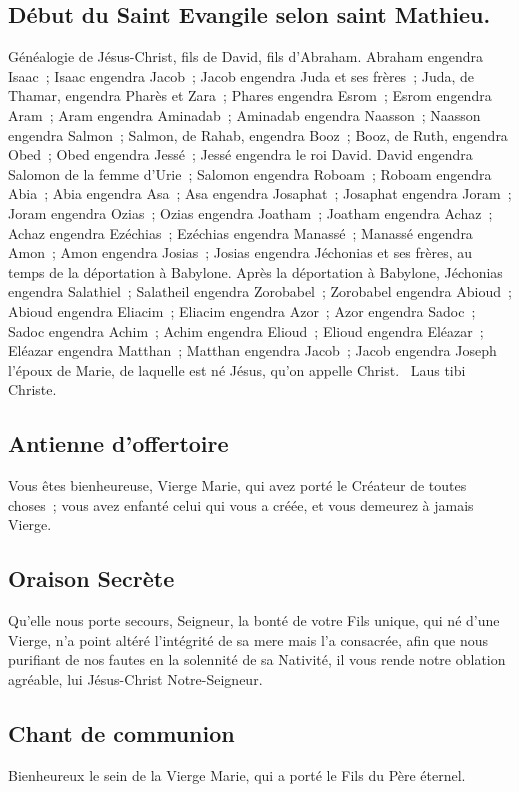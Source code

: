 \begin{multicols}{2}
{\subsection*{Début du Saint Evangile selon saint Mathieu.}
Généalogie de Jésus-Christ, fils de David, fils d’Abraham. Abraham engendra Isaac ; Isaac engendra Jacob ; Jacob engendra Juda et ses frères ; Juda, de Thamar, engendra Pharès et Zara ; Phares engendra Esrom ; Esrom engendra Aram ; Aram engendra Aminadab ; Aminadab engendra Naasson ; Naasson engendra Salmon ; Salmon, de Rahab, engendra Booz ; Booz, de Ruth, engendra Obed ; Obed engendra Jessé ; Jessé engendra le roi David. David engendra Salomon de la femme d’Urie ; Salomon engendra Roboam ; Roboam engendra Abia ; Abia engendra Asa ; Asa engendra Josaphat ; Josaphat engendra Joram ; Joram engendra Ozias ; Ozias engendra Joatham ; Joatham engendra Achaz ; Achaz engendra Ezéchias ; Ezéchias engendra Manassé ; Manassé engendra Amon ; Amon engendra Josias ; Josias engendra Jéchonias et ses frères, au temps de la déportation à Babylone. Après la déportation à Babylone, Jéchonias engendra Salathiel ; Salatheil engendra Zorobabel ; Zorobabel engendra Abioud ; Abioud engendra Eliacim ; Eliacim engendra Azor ; Azor engendra Sadoc ; Sadoc engendra Achim ; Achim engendra Elioud ; Elioud engendra Eléazar ; Eléazar engendra Matthan ; Matthan engendra Jacob ; Jacob engendra Joseph l’époux de Marie, de laquelle est né Jésus, qu’on appelle Christ.
{\textbf \rb\ Laus tibi Christe.}


\subsection*{Antienne d'offertoire}
Vous êtes bienheureuse, Vierge Marie, qui avez porté le Créateur de toutes choses ; vous avez enfanté celui qui vous a créée, et vous demeurez à jamais Vierge.

\subsection*{Oraison Secrète}
Qu’elle nous porte secours, Seigneur, la bonté de votre Fils unique, qui né d’une Vierge, n’a point altéré l’intégrité de sa mere mais l’a consacrée, afin que nous purifiant de nos fautes en la solennité de sa Nativité, il vous rende notre oblation agréable, lui Jésus-Christ Notre-Seigneur.

\subsection*{Chant de communion}
Bienheureux le sein de la Vierge Marie, qui a porté le Fils du Père éternel.

}
\end{multicols}
